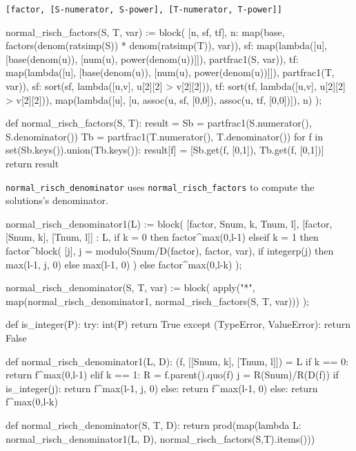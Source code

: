 \begin{center}
\begin{verbatim}
[factor, [S-numerator, S-power], [T-numerator, T-power]]
\end{verbatim}
\end{center}

\begin{maximacode}
normal_risch_factors(S, T, var) := block(
   [n, sf, tf],
   n: map(base,
          factors(denom(ratsimp(S))
                  * denom(ratsimp(T)), var)),
   sf: map(lambda([u], [base(denom(u)),
                        [num(u), power(denom(u))]]),
           partfrac1(S, var)),
   tf: map(lambda([u], [base(denom(u)),
                        [num(u), power(denom(u))]]),
           partfrac1(T, var)),
   sf: sort(sf, lambda([u,v], u[2][2] > v[2][2])),
   tf: sort(tf, lambda([u,v], u[2][2] > v[2][2])),
   map(lambda([u], [u, assoc(u, sf, [0,0]),
                       assoc(u, tf, [0,0])]), n)
);
\end{maximacode}

\begin{sagecommon}
def normal_risch_factors(S, T):
   result = {}
   Sb = partfrac1(S.numerator(), S.denominator())
   Tb = partfrac1(T.numerator(), T.denominator())
   for f in set(Sb.keys()).union(Tb.keys()):
      result[f] = [Sb.get(f, [0,1]), Tb.get(f, [0,1])]
   return result
\end{sagecommon}

{\tt normal_risch_denominator} uses {\tt normal_risch_factors}
to compute the solutions's denominator.

\begin{maximacode}
normal_risch_denominator1(L) := block(
   [factor, Snum, k, Tnum, l],
   [factor, [Snum, k], [Tnum, l]] : L,
   if k = 0 then factor^max(0,l-1)
   elseif k = 1 then factor^block(
      [j],
      j = modulo(Snum/D(factor), factor, var),
      if integerp(j) then max(l-1, j, 0)
                     else max(l-1, 0)
   )
   else factor^max(0,l-k)
);

normal_risch_denominator(S, T, var) := block(
   apply("*",
      map(normal_risch_denominator1,
         normal_risch_factors(S, T, var)))
);
\end{maximacode}

\begin{sagecommon}
def is_integer(P):
   try:
      int(P)
      return True
   except (TypeError, ValueError):
      return False

def normal_risch_denominator1(L, D):
   (f, [[Snum, k], [Tnum, l]]) = L
   if k == 0:
      return f^max(0,l-1)
   elif k == 1:
      R = f.parent().quo(f)
      j = R(Snum)/R(D(f))
      if is_integer(j):
         return f^max(l-1, j, 0)
      else:
         return f^max(l-1, 0)
   else:
      return f^max(0,l-k)

def normal_risch_denominator(S, T, D):
  return prod(map(lambda L: normal_risch_denominator1(L, D), normal_risch_factors(S,T).items()))
\end{sagecommon}

